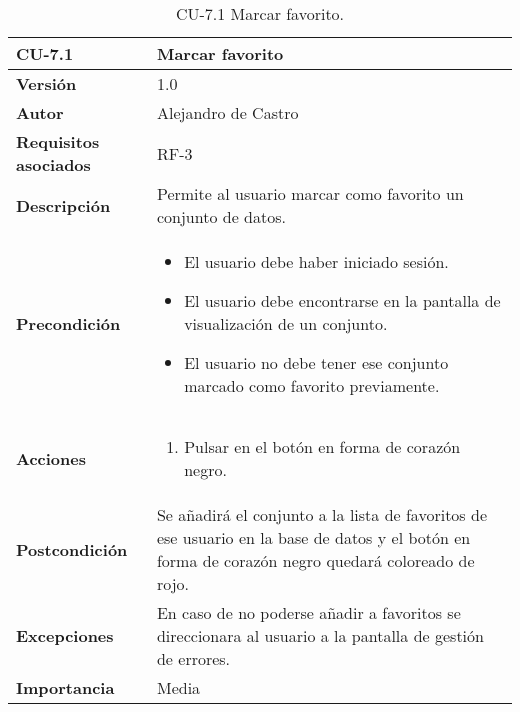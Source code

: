 \begin{table}[p]
	\centering
	\begin{tabularx}{\linewidth}{ p{} p{} }
		\toprule
		\textbf{CU-7.1}    & \textbf{Marcar favorito}\\
		\toprule
		\textbf{Versión}              & 1.0    \\
		\textbf{Autor}                & {Alejandro de Castro} \\
		\textbf{Requisitos asociados} & RF-3 \\
		\textbf{Descripción}          & Permite al usuario marcar como favorito un conjunto de datos. \\
		\textbf{Precondición}         & \begin{itemize}
		    \item El usuario debe haber iniciado sesión. 
            \item El usuario debe encontrarse en la pantalla de visualización de un conjunto. 
            \item El usuario no debe tener ese conjunto marcado como favorito previamente. 
		\end{itemize} \\
        \textbf{Acciones}             &
		\begin{enumerate}
			\def\labelenumi{\arabic{enumi}.}
			\tightlist
			\item Pulsar en el botón en forma de corazón negro.
		\end{enumerate} \\ 
		\textbf{Postcondición}        & Se añadirá el conjunto a la lista de favoritos de ese usuario en la base de datos y el botón en forma de corazón negro quedará coloreado de rojo. \\
		\textbf{Excepciones}          & En caso de no poderse añadir a favoritos se direccionara al usuario a la pantalla de gestión de errores. \\
		\textbf{Importancia}          & Media \\
		\bottomrule
	\end{tabularx}
	\caption{CU-7.1 Marcar favorito.}
\end{table}

